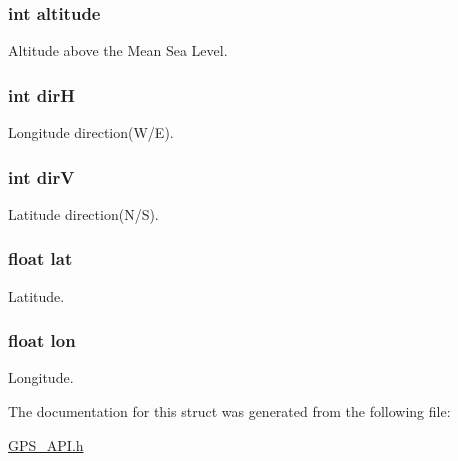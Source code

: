 \subsubsection[{altitude}]{\setlength{\rightskip}{0pt plus 5cm}int altitude}\label{struct_g_p_s___pos_a9e54ec2d7e031746f3e5b03e7c36a28e}


Altitude above the Mean Sea Level. 

\hypertarget{struct_g_p_s___pos_af04238fbd3021bba0b7ab2531a828c72}{}
\subsubsection[{dir\+H}]{\setlength{\rightskip}{0pt plus 5cm}int dir\+H}\label{struct_g_p_s___pos_af04238fbd3021bba0b7ab2531a828c72}


Longitude direction(W/\+E). 

\hypertarget{struct_g_p_s___pos_ab3d7fbfa15088b89e1fb7c8587ce51ec}{}
\subsubsection[{dir\+V}]{\setlength{\rightskip}{0pt plus 5cm}int dir\+V}\label{struct_g_p_s___pos_ab3d7fbfa15088b89e1fb7c8587ce51ec}


Latitude direction(N/\+S). 

\hypertarget{struct_g_p_s___pos_ae55f065c95e023aa6c2514b2b9ad4a22}{}
\subsubsection[{lat}]{\setlength{\rightskip}{0pt plus 5cm}float lat}\label{struct_g_p_s___pos_ae55f065c95e023aa6c2514b2b9ad4a22}


Latitude. 

\hypertarget{struct_g_p_s___pos_af59ee077fefdb65db12a1543dde1d21f}{}
\subsubsection[{lon}]{\setlength{\rightskip}{0pt plus 5cm}float lon}\label{struct_g_p_s___pos_af59ee077fefdb65db12a1543dde1d21f}


Longitude. 



The documentation for this struct was generated from the following file\+:\begin{DoxyCompactItemize}
\item 
\hyperlink{_g_p_s___a_p_i_8h}{G\+P\+S\+\_\+\+A\+P\+I.\+h}\end{DoxyCompactItemize}
